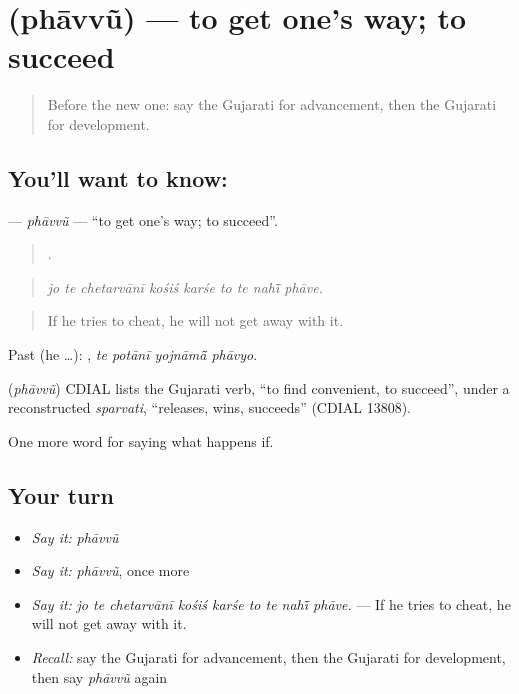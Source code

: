 \section[\texorpdfstring{\gu{ફાવવું} (phāvvũ)}{ફાવવું (phāvvũ)}]{ (phāvvũ) — to get one's way; to succeed}

\label{lesson:GU-C384-phavvu}



\begin{quote}
Before the new one: say the Gujarati for advancement, then the Gujarati for development.
\end{quote}

\subsection*{You'll want to know: }
\textbf{} — \emph{phāvvũ} — \textquotedblleft{}to get one's way; to succeed\textquotedblright{}.

\begin{quote}
        .
\end{quote}

\begin{quote}
\emph{jo te chetarvānī kośiś karśe to te nahī̃ phāve.}
\end{quote}

\begin{quote}
If he tries to cheat, he will not get away with it.
\end{quote}

Past (he …):    , \emph{te potānī yojnāmā̃ phāvyo}.

\begin{cousinweb}
\textbf{} (\emph{phāvvũ}) CDIAL lists the Gujarati verb, \textquotedblleft{}to find convenient, to succeed\textquotedblright{}, under a reconstructed \emph{sparvati}, \textquotedblleft{}releases, wins, succeeds\textquotedblright{} (CDIAL 13808).
\end{cousinweb}

\begin{grammarlens}[title={What you've built}]
One more word for saying what happens if.
\end{grammarlens}

\subsection*{Your turn}
\begin{itemize}
\raggedright
  \item \emph{Say it:} \emph{phāvvũ}
  \item \emph{Say it:} \emph{phāvvũ}, once more
  \item \emph{Say it:} \emph{jo te chetarvānī kośiś karśe to te nahī̃ phāve.} — If he tries to cheat, he will not get away with it.
  \item \emph{Recall:} say the Gujarati for advancement, then the Gujarati for development, then say \emph{phāvvũ} again
\end{itemize}

